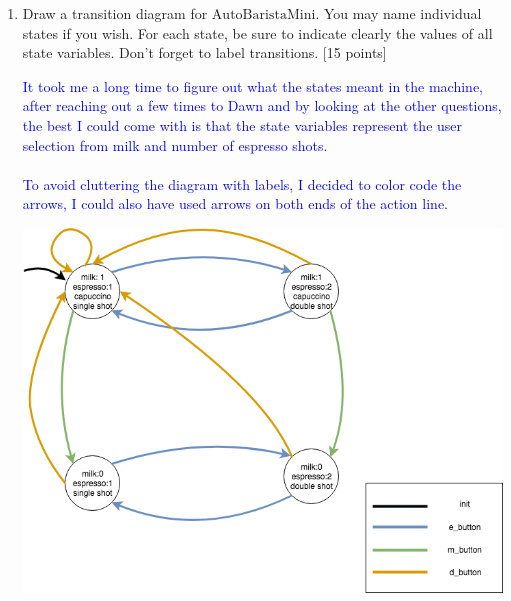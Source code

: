 \documentclass[12pt,fleqn]{article}
\begin{document}
\begin{enumerate}
\item Draw a transition diagram for $\mathrm{AutoBaristaMini}$. You may name individual states if you wish. For each state, be sure to indicate clearly the values of all state variables. Don't forget to label transitions. [15 points]
%
%
%
%
%
%
%

  \textcolor{blue}{It took me a long time to figure out what the states meant in the machine, after reaching
    out a few times to Dawn and by looking at the other questions, the best I could come with is that the state variables represent the user selection from milk and number of espresso shots.\\
\\
  To avoid cluttering the diagram with labels, I decided to color code the arrows, I could also have used arrows on both ends of the action line.}
  

\begin{center}
\includegraphics[width=6in]{BaristaMini.png}
\end{center}


\end{enumerate}
\end{document}
